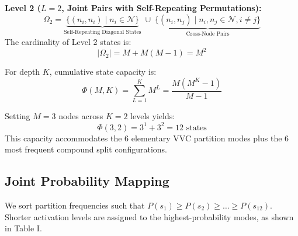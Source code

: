 \documentclass[conference]{IEEEtran}
\begin{document}
\textbf{Level 2 ($L=2$, Joint Pairs with Self-Repeating Permutations):}
\begin{equation}
\Omega_2 = \underbrace{\{ (n_i, n_i) \mid n_i \in \mathcal{N} \}}_{\text{Self-Repeating Diagonal States}} \;\cup\; \underbrace{\{ (n_i, n_j) \mid n_i, n_j \in \mathcal{N}, i \ne j \}}_{\text{Cross-Node Pairs}}
\end{equation}
The cardinality of Level 2 states is:
\begin{equation}
|\Omega_2| = M + M(M - 1) = M^2
\end{equation}

For depth $K$, cumulative state capacity is:
\begin{equation}
\Phi(M, K) = \sum_{L=1}^{K} M^L = \frac{M(M^K - 1)}{M - 1}
\end{equation}

Setting $M = 3$ nodes across $K = 2$ levels yields:
\begin{equation}
\Phi(3, 2) = 3^1 + 3^2 = 12 \text{ states}
\end{equation}
This capacity accommodates the 6 elementary VVC partition modes plus the 6 most frequent compound split configurations.

\subsection{Joint Probability Mapping}
We sort partition frequencies such that $P(s_1) \ge P(s_2) \ge \dots \ge P(s_{12})$. Shorter activation levels are assigned to the highest-probability modes, as shown in Table I.
\end{document}
